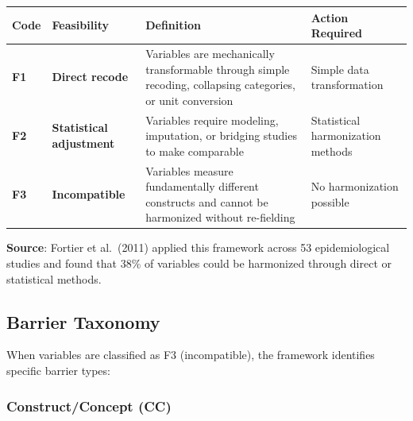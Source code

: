 \documentclass[
  letterpaper,
]{report}
\begin{document}
\begin{longtable}[]{@{}
  >{\raggedright\arraybackslash}p{}
  >{\raggedright\arraybackslash}p{}
  >{\raggedright\arraybackslash}p{}
  >{\raggedright\arraybackslash}p{}@{}}
\toprule\noalign{}
\begin{minipage}[b]{\linewidth}\raggedright
Code
\end{minipage} & \begin{minipage}[b]{\linewidth}\raggedright
Feasibility
\end{minipage} & \begin{minipage}[b]{\linewidth}\raggedright
Definition
\end{minipage} & \begin{minipage}[b]{\linewidth}\raggedright
Action Required
\end{minipage} \\
\midrule\noalign{}
\endhead
\bottomrule\noalign{}
\endlastfoot
\textbf{F1} & \textbf{Direct recode} & Variables are mechanically
transformable through simple recoding, collapsing categories, or unit
conversion & Simple data transformation \\
\textbf{F2} & \textbf{Statistical adjustment} & Variables require
modeling, imputation, or bridging studies to make comparable &
Statistical harmonization methods \\
\textbf{F3} & \textbf{Incompatible} & Variables measure fundamentally
different constructs and cannot be harmonized without re-fielding & No
harmonization possible \\
\end{longtable}

\textbf{Source}: Fortier et al.~(2011) applied this framework across 53
epidemiological studies and found that 38\% of variables could be
harmonized through direct or statistical methods.

\subsection{Barrier Taxonomy}\label{barrier-taxonomy}

When variables are classified as F3 (incompatible), the framework
identifies specific barrier types:

\subsubsection{Construct/Concept (CC)}\label{constructconcept-cc}
\end{document}
